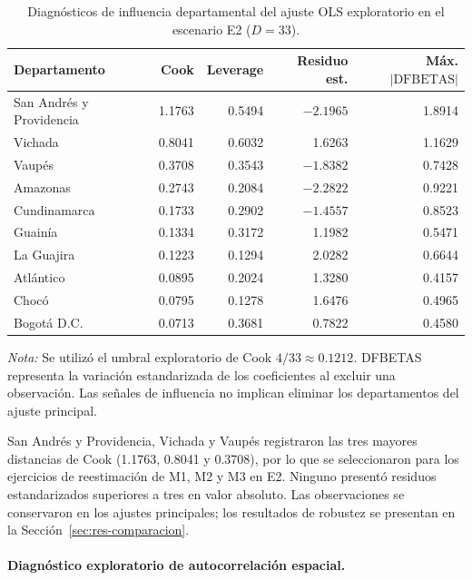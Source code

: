 \begin{table}[!htbp]
\centering
\scriptsize
\caption{Diagnósticos de influencia departamental del ajuste OLS exploratorio en el escenario E2 ($D=33$).}
\label{tab:ols-influencia-e2}
\renewcommand{\arraystretch}{1.1}
\setlength{\tabcolsep}{3.5pt}
\begin{tabular}{l r r r r}
\hline
Departamento & Cook & Leverage & Residuo est. & Máx. $|\mathrm{DFBETAS}|$ \\
\hline
San Andrés y Providencia & 1.1763 & 0.5494 & $-2.1965$ & 1.8914 \\
Vichada & 0.8041 & 0.6032 & 1.6263 & 1.1629 \\
Vaupés & 0.3708 & 0.3543 & $-1.8382$ & 0.7428 \\
Amazonas & 0.2743 & 0.2084 & $-2.2822$ & 0.9221 \\
Cundinamarca & 0.1733 & 0.2902 & $-1.4557$ & 0.8523 \\
Guainía & 0.1334 & 0.3172 & 1.1982 & 0.5471 \\
La Guajira & 0.1223 & 0.1294 & 2.0282 & 0.6644 \\
Atlántico & 0.0895 & 0.2024 & 1.3280 & 0.4157 \\
Chocó & 0.0795 & 0.1278 & 1.6476 & 0.4965 \\
Bogotá D.C. & 0.0713 & 0.3681 & 0.7822 & 0.4580 \\
\hline
\end{tabular}

\vspace{2mm}
\parbox{0.95\linewidth}{\footnotesize
\textit{Nota:} Se utilizó el umbral exploratorio de Cook $4/33\approx0.1212$. DFBETAS representa la variación estandarizada de los coeficientes al excluir una observación. Las señales de influencia no implican eliminar los departamentos del ajuste principal.
}
\end{table}

San Andrés y Providencia, Vichada y Vaupés registraron las tres mayores distancias de Cook (1.1763, 0.8041 y 0.3708), por lo que se seleccionaron para los ejercicios de reestimación de M1, M2 y M3 en E2. Ninguno presentó residuos estandarizados superiores a tres en valor absoluto. Las observaciones se conservaron en los ajustes principales; los resultados de robustez se presentan en la Sección~\ref{sec:res-comparacion}.

\paragraph{Diagnóstico exploratorio de autocorrelación espacial.}

